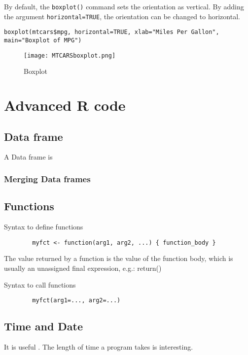 \documentclass[a4paper,12pt]{article}
\begin{document}
By default, the \texttt{boxplot()} command sets the orientation as vertical. By adding the argument \texttt{horizontal=TRUE}, the orientation can be changed to horizontal.
\footnotesize
\begin{myindentpar}{1cm}
\begin{verbatim}
boxplot(mtcars$mpg, horizontal=TRUE, xlab="Miles Per Gallon",
main="Boxplot of MPG")
\end{verbatim}
\end{myindentpar}\normalsize

\begin{figure}
  \texttt{[image: MTCARSboxplot.png]}\\
  \caption{Boxplot}\label{boxplot}
\end{figure}



\newpage
\chapter{Advanced R code}
\section{Data frame}
A Data frame is
\subsection{Merging Data frames}

\section{Functions}
Syntax to define functions

\begin{myindentpar}{1cm}
\begin{verbatim}
        myfct <- function(arg1, arg2, ...) { function_body }
\end{verbatim}
\end{myindentpar}
The value returned by a function is the value of the function body, which is usually an unassigned final expression, e.g.: return()

Syntax to call functions
\begin{myindentpar}{1cm}
\begin{verbatim}
        myfct(arg1=..., arg2=...)
\end{verbatim}
\end{myindentpar}


\section{Time and Date}
It is useful . The length of time a program takes is interesting.
\end{document}
